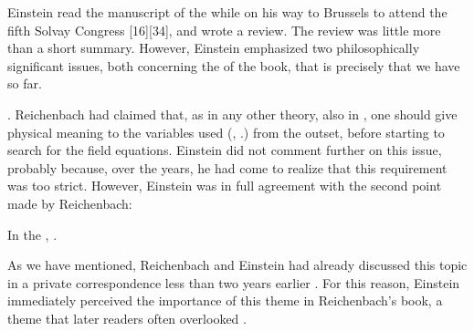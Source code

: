 \documentclass[draft]{article}
\newcommand{\PRZL}{\citetitle{Reichenbach1928}\xspace}
\begin{document}




Einstein read the manuscript of the \PRZL while on his way to Brussels to attend the fifth Solvay Congress  \citep{Bacciagaluppi2009} [16][34], and wrote a review. The review was little more than a short summary. However, Einstein emphasized two philosophically significant issues, both concerning the \Ap of the book, that is precisely that we have so far. \begin{inparaenum}[(1)] \item {} \citep[20\me]{Einstein1928d}. Reichenbach had claimed that, as in any other  theory, also in \uft, one should give physical meaning to the variables used (\gmn, \Gtmn\etc.) from the outset, before starting to search for the field equations. Einstein did not comment further on this issue, probably because, over the years, he had come to realize that this requirement was too strict. However, Einstein was in full agreement with the second point made by Reichenbach: \item In the \Ap,  \citep[20\me]{Einstein1928d}. \end{inparaenum} As we have mentioned, Reichenbach and Einstein had already discussed this topic in a private correspondence less than two years earlier . For this reason, Einstein immediately perceived the importance of this theme in Reichenbach's book, a theme that later readers often overlooked . 
\end{document}
